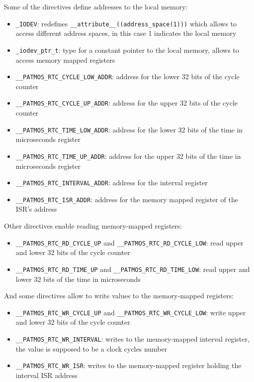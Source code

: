 Some of the directives define addresses to the local memory:

\begin{itemize}
	\item \texttt{\_IODEV}: redefines \texttt{\_\_attribute\_\_((address\allowbreak\_space\allowbreak(1)))} which allows to access different address spaces, in this case 1 indicates the local memory
	\item \texttt{\_iodev\_ptr\_t}: type for a constant pointer to the local memory, allows to access memory mapped registers
	\item \texttt{\_\_PATMOS\_RTC\_CYCLE\_LOW\_ADDR}: address for the lower 32 bits of the cycle counter
	\item \texttt{\_\_PATMOS\_RTC\_CYCLE\_UP\_ADDR}: address for the upper 32 bits of the cycle counter
	\item \texttt{\_\_PATMOS\_RTC\_TIME\_LOW\_ADDR}: address for the lower 32 bits of the time in microseconds register
	\item \texttt{\_\_PATMOS\_RTC\_TIME\_UP\_ADDR}: address for the upper 32 bits of the time in microseconds register
	\item \texttt{\_\_PATMOS\_RTC\_INTERVAL\_ADDR}: address for the interval register
	\item \texttt{\_\_PATMOS\_RTC\_ISR\_ADDR}: address for the memory mapped register of the ISR's address
\end{itemize}

Other directives enable reading memory-mapped registers:

\begin{itemize}
	\item  \texttt{\_\_PATMOS\_RTC\_RD\_CYCLE\_UP} and \texttt{\_\_PATMOS\_RTC\_RD\_CYCLE\_LOW}: read upper and lower 32 bits of the cycle counter
	\item \texttt{\_\_PATMOS\_RTC\_RD\_TIME\_UP} and \texttt{\_\_PATMOS\_RTC\_RD\_TIME\_LOW}: read upper and lower 32 bits of the time in microseconds
\end{itemize}

And some directives allow to write values to the memory-mapped registers:

\begin{itemize}
	\item \texttt{\_\_PATMOS\_RTC\_WR\_CYCLE\_UP} and \texttt{\_\_PATMOS\_RTC\_WR\_CYCLE\_LOW}: write upper and lower 32 bits of the cycle counter
	\item \texttt{\_\_PATMOS\_RTC\_WR\_INTERVAL}: writes to the memory-mapped interval register, the value is supposed to be a clock cycles number
	\item \texttt{\_\_PATMOS\_RTC\_WR\_ISR}: writes to the memory-mapped register holding the interval ISR address
\end{itemize}

